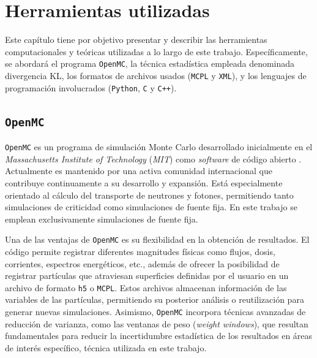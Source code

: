 \chapter{Herramientas utilizadas}
\label{cap:herramientas}

Este capítulo tiene por objetivo presentar y describir las herramientas computacionales y teóricas utilizadas a lo largo de este trabajo. Específicamente, se abordará el programa \texttt{OpenMC}, la técnica estadística empleada denominada divergencia KL, los formatos de archivos usados (\texttt{MCPL} y \texttt{XML}), y los lenguajes de programación involucrados (\texttt{Python}, \texttt{C} y \texttt{C++}).

\section{\texttt{OpenMC}}


\texttt{OpenMC} es un programa de simulación Monte Carlo desarrollado inicialmente en el \textit{Massachusetts Institute of Technology} (\textit{MIT}) como \textit{software} de código abierto \cite{OpenMC2024}. Actualmente es mantenido por una activa comunidad internacional que contribuye continuamente a su desarrollo y expansión. Está especialmente orientado al cálculo del transporte de neutrones y fotones, permitiendo tanto simulaciones de criticidad como simulaciones de fuente fija. En este trabajo se emplean exclusivamente simulaciones de fuente fija.

Una de las ventajas de \texttt{OpenMC} es su flexibilidad en la obtención de resultados. El código permite registrar diferentes magnitudes físicas como flujos, dosis, corrientes, espectros energéticos, etc., además de ofrecer la posibilidad de registrar partículas que atraviesan superficies definidas por el usuario en un archivo de formato \texttt{h5} o \texttt{MCPL}. Estos archivos almacenan información de las variables de las partículas, permitiendo su posterior análisis o reutilización para generar nuevas simulaciones. Asimismo, \texttt{OpenMC} incorpora técnicas avanzadas de reducción de varianza, como las ventanas de peso (\textit{weight windows}), que resultan fundamentales para reducir la incertidumbre estadística de los resultados en áreas de interés específico, técnica utilizada en este trabajo.

